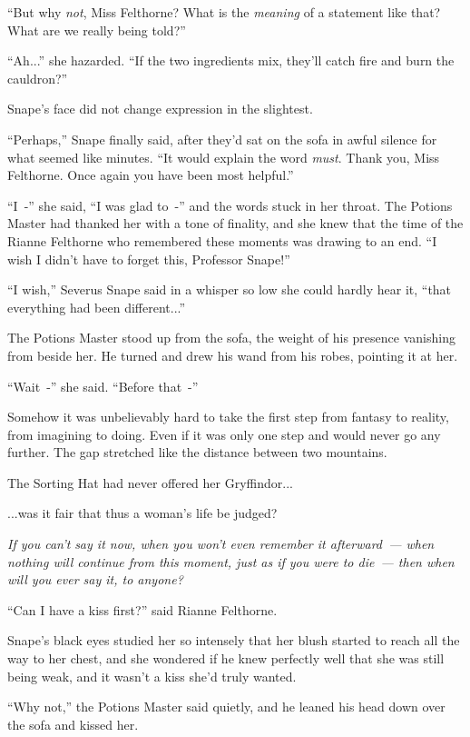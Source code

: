 ``But why \emph{not}, Miss Felthorne? What is the \emph{meaning} of a statement like that? What are we really being told?''

``Ah...'' she hazarded. ``If the two ingredients mix, they'll catch fire and burn the cauldron?''

Snape's face did not change expression in the slightest.

``Perhaps,'' Snape finally said, after they'd sat on the sofa in awful silence for what seemed like minutes. ``It would explain the word \emph{must}. Thank you, Miss Felthorne. Once again you have been most helpful.''

``I~-'' she said, ``I was glad to~-'' and the words stuck in her throat. The Potions Master had thanked her with a tone of finality, and she knew that the time of the Rianne Felthorne who remembered these moments was drawing to an end. ``I wish I didn't have to forget this, Professor Snape!''

``I wish,'' Severus Snape said in a whisper so low she could hardly hear it, ``that everything had been different...''

The Potions Master stood up from the sofa, the weight of his presence vanishing from beside her. He turned and drew his wand from his robes, pointing it at her.

``Wait~-'' she said. ``Before that~-''

Somehow it was unbelievably hard to take the first step from fantasy to reality, from imagining to doing. Even if it was only one step and would never go any further. The gap stretched like the distance between two mountains.

The Sorting Hat had never offered her Gryffindor...

...was it fair that thus a woman's life be judged?

\emph{If you can't} \emph{say it now, when you won't even remember it afterward~--- when nothing will continue from this moment, just as if you were to die~--- then when will you ever say it, to anyone?}

``Can I have a kiss first?'' said Rianne Felthorne.

Snape's black eyes studied her so intensely that her blush started to reach all the way to her chest, and she wondered if he knew perfectly well that she was still being weak, and it wasn't a kiss she'd truly wanted.

``Why not,'' the Potions Master said quietly, and he leaned his head down over the sofa and kissed her.

